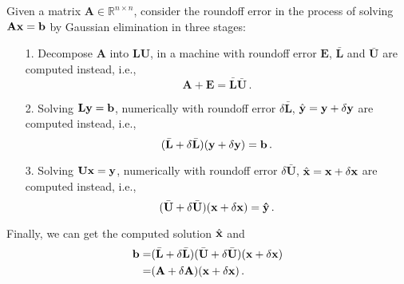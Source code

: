 \documentclass[english,onecolumn]{IEEEtran}
\begin{document}
Given a matrix $\mathbf{A}\in \mathbb{R}^{n\times n}$, consider the roundoff error in the process of solving $\mathbf{A}\bf{x} = \bf{b}$ by Gaussian elimination in three stages:
\begin{enumerate}
    \item[1.] Decompose $\mathbf{A}$ into $\mathbf{L}\mathbf{U}$, in a machine with roundoff error $\mathbf{E}$, $\bar{\mathbf{L}}$ and $\bar{\mathbf{U}}$ are computed instead, i.e., 
    \begin{equation*}
        \mathbf{A} + \mathbf{E} = \bar{\mathbf{L}}\bar{\mathbf{U}}\,.
    \end{equation*}
    \item[2.] Solving $\mathbf{L}\bf{y} = \bf{b}$, numerically with roundoff error $\delta \mathbf{\bar{L}}$, $\hat{\mathbf{y}} = \bf{y}+\delta \bf{y}$ are computed instead, i.e.,
    \begin{equation*}
        (\bar{\mathbf{L}}+\delta \bar{\mathbf{L}})(\bf{y}+\delta \bf{y}) = \bf{b}\,.
    \end{equation*}
    \item[3.] Solving $\mathbf{U}\bf{x} = \bf{y}$, numerically with roundoff error $\delta \mathbf{\bar{U}}$, $\hat{\bf{x}} = \bf{x}+\delta \bf{x}$ are computed instead, i.e.,
    \begin{equation*}
        (\bar{\mathbf{U}}+\delta \bar{\mathbf{U}})(\bf{x}+\delta \bf{x}) = \hat{y}\,.
    \end{equation*}
\end{enumerate}
Finally, we can get the computed solution $\hat{\bf{x}}$ and 
\begin{align*}
    \bf{b} = &(\bar{\mathbf{L}}+\delta \bar{\mathbf{L}})(\bar{\mathbf{U}}+\delta \bar{\mathbf{U}})(\bf{x}+\delta \bf{x})\\
     = & (\mathbf{A}+\delta \mathbf{A})(\bf{\bf{x}}+\delta \bf{\bf{x}})\,.
\end{align*}
\end{document}
